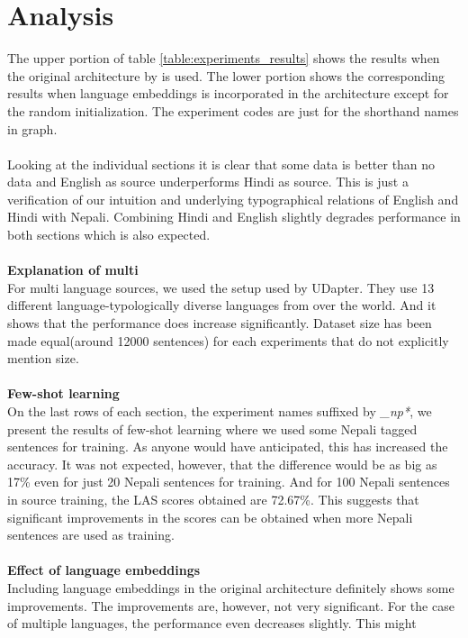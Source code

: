 \section{Analysis}
The upper portion of table \ref{table:experiments_results} shows the results
when the original architecture by \cite{steps-parser} is used. The lower
portion shows the corresponding results when language embeddings is
incorporated in the architecture except for the random initialization. The
experiment codes are just for the shorthand names in graph.
\\~\\
Looking at the individual sections it is clear that some data is better than no
data and English as source underperforms Hindi as source. This is just a
verification of our intuition and underlying typographical relations of English
and Hindi with Nepali. Combining Hindi and English slightly degrades
performance in both sections which is also expected.
\\~\\
\textbf{Explanation of multi}\\
For multi language sources, we used the setup used by UDapter\cite{udapter}.
They use 13 different language-typologically diverse languages from over the
world. And it shows that the performance does increase significantly. Dataset
size has been made equal(around 12000 sentences) for each experiments that do
not explicitly mention size.
\\~\\
\textbf{Few-shot learning}\\
On the last rows of each section, the experiment names suffixed by
\textit{\_np*}, we present the results of few-shot learning where we used some
Nepali tagged sentences for training. As anyone would have anticipated, this
has increased the accuracy. It was not expected, however, that the difference
would be as big as 17\% even for just 20 Nepali sentences for training. And for
100 Nepali sentences in source training, the LAS scores obtained are 72.67\%.
This suggests that significant improvements in the scores can be obtained when
more Nepali sentences are used
as training.
\\~\\
\textbf{Effect of language embeddings}\\
Including language embeddings in the original architecture definitely shows
some improvements. The improvements are, however, not very significant. For the
case of multiple languages, the performance even decreases slightly. This might
